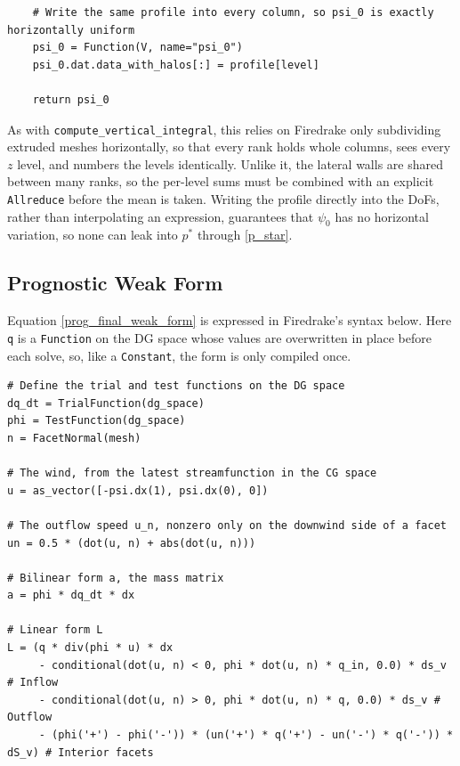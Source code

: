 \documentclass{article}
\begin{document}
\begin{appendices}
\begin{verbatim}
    # Write the same profile into every column, so psi_0 is exactly horizontally uniform
    psi_0 = Function(V, name="psi_0")
    psi_0.dat.data_with_halos[:] = profile[level]

    return psi_0
\end{verbatim}

As with \texttt{compute_vertical_integral}, this relies on Firedrake only subdividing extruded meshes horizontally, so that every rank holds whole columns, sees every $z$ level, and numbers the levels identically.
Unlike it, the lateral walls are shared between many ranks, so the per-level sums must be combined with an explicit \texttt{Allreduce} before the mean is taken.
Writing the profile directly into the DoFs, rather than interpolating an expression, guarantees that $\psi_0$ has no horizontal variation, so none can leak into $p^*$ through \cref{p_star}.

\subsection{Prognostic Weak Form}\label{app:prognostic_weak_form}

Equation \eqref{prog_final_weak_form} is expressed in Firedrake's syntax below.
Here \texttt{q} is a \texttt{Function} on the DG space whose values are overwritten in place before each solve, so, like a \texttt{Constant}, the form is only compiled once.

\begin{verbatim}
# Define the trial and test functions on the DG space
dq_dt = TrialFunction(dg_space)
phi = TestFunction(dg_space)
n = FacetNormal(mesh)

# The wind, from the latest streamfunction in the CG space
u = as_vector([-psi.dx(1), psi.dx(0), 0])

# The outflow speed u_n, nonzero only on the downwind side of a facet
un = 0.5 * (dot(u, n) + abs(dot(u, n)))

# Bilinear form a, the mass matrix
a = phi * dq_dt * dx

# Linear form L
L = (q * div(phi * u) * dx
     - conditional(dot(u, n) < 0, phi * dot(u, n) * q_in, 0.0) * ds_v # Inflow
     - conditional(dot(u, n) > 0, phi * dot(u, n) * q, 0.0) * ds_v # Outflow
     - (phi('+') - phi('-')) * (un('+') * q('+') - un('-') * q('-')) * dS_v) # Interior facets
\end{verbatim}


\end{appendices}
\end{document}
